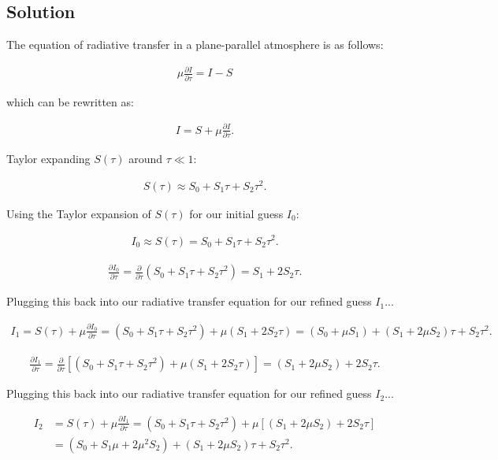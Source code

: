 \documentclass[12pt]{article}
\begin{document}
\subsection*{Solution}

The equation of radiative transfer in a plane-parallel atmosphere is as follows:

\begin{align*}
\mu\frac{\partial I}{\partial \tau} = I - S
\end{align*}

which can be rewritten as:

\begin{align*}
I = S + \mu\frac{\partial I}{\partial \tau}.
\end{align*}

Taylor expanding $S(\tau)$ around $\tau \ll 1$:

\begin{align*}
S(\tau) \approx S_0 + S_1\tau + S_2\tau^2.
\end{align*}

Using the Taylor expansion of $S(\tau)$ for our initial guess $I_0$:

\begin{align*}
I_0 \approx S(\tau) = S_0 + S_1\tau + S_2\tau^2.
\end{align*}

\begin{align*}
\frac{\partial I_0}{\partial \tau} = \frac{\partial}{\partial \tau}(S_0 + S_1\tau + S_2\tau^2) = S_1 + 2S_2\tau.
\end{align*}

Plugging this back into our radiative transfer equation for our refined guess $I_1$...

\begin{align*}
I_1 = S(\tau) + \mu\frac{\partial I_0}{\partial \tau} = (S_0 + S_1\tau + S_2\tau^2) + \mu(S_1 + 2S_2\tau) = (S_0+\mu S_1) + (S_1+2\mu S_2)\tau + S_2\tau^2.
\end{align*}

\begin{align*}
\frac{\partial I_1}{\partial \tau} = \frac{\partial}{\partial \tau}\left[(S_0 + S_1\tau + S_2\tau^2) + \mu(S_1 + 2S_2\tau)\right] = (S_1+2\mu S_2) + 2S_2\tau.
\end{align*}

Plugging this back into our radiative transfer equation for our refined guess $I_2$...

\begin{equation*}
\begin{split}
I_2 &= S(\tau) + \mu\frac{\partial I_1}{\partial \tau} = (S_0 + S_1\tau + S_2\tau^2) + \mu\left[(S_1+2\mu S_2) + 2S_2\tau\right] \\
&= (S_0+S_1 \mu+2\mu^2S_2) + (S_1+2\mu S_2)\tau + S_2\tau^2.
\end{split}
\end{equation*}
\end{document}
